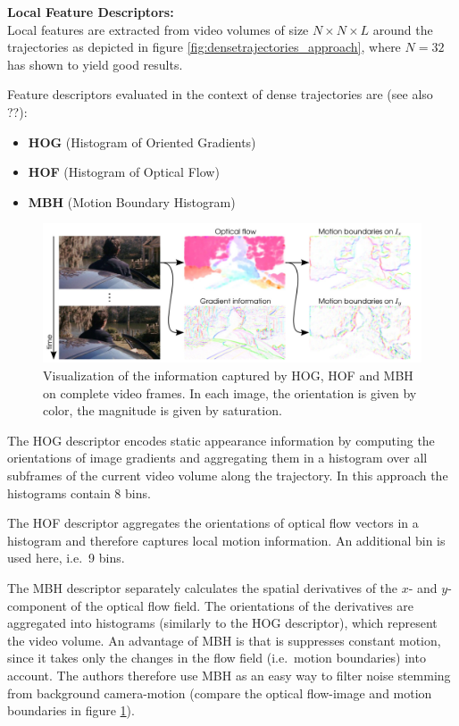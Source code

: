 \textbf{Local Feature Descriptors:}\\
Local features are extracted from video volumes of size $N \times N \times L$ around the trajectories as depicted in figure \ref{fig:densetrajectories_approach}, where $N = 32$ has shown to yield good results.

Feature descriptors evaluated in the context of dense trajectories are (see also ??):
\begin{itemize}
    \item \textbf{HOG} (Histogram of Oriented Gradients) \cite{dalal_histograms_2005-1}
    \item \textbf{HOF} (Histogram of Optical Flow) \cite{laptev_learning_2008}
    \item \textbf{MBH} (Motion Boundary Histogram) \cite{dalal_human_2006}
\end{itemize}

\begin{figure}[H]
    \centering
    \includegraphics[width=\textwidth]{img_conventional/densetrajectories_featurevisualization}
    \caption{Visualization of the information captured by HOG, HOF and MBH on complete video frames. In each image, the orientation is given by color, the magnitude is given by saturation. \cite{wang_action_2011}}
    \label{fig:densetrajectories_featurevisualization}
\end{figure}

The HOG descriptor encodes static appearance information by computing the orientations of image gradients and aggregating them in a histogram over all subframes of the current video volume along the trajectory. In this approach the histograms contain 8 bins.

The HOF descriptor aggregates the orientations of optical flow vectors in a histogram and therefore captures local motion information. An additional bin is used here, i.e.\ 9 bins.

The MBH descriptor separately calculates the spatial derivatives of the $x$- and $y$-component of the optical flow field.
The orientations of the derivatives are aggregated into histograms (similarly to the HOG descriptor), which represent the video volume.
An advantage of MBH is that is suppresses constant motion, since it takes only the changes in the flow field (i.e.\ motion boundaries) into account.
The authors therefore use MBH as an easy way to filter noise stemming from background camera-motion (compare the optical flow-image and motion boundaries in figure \ref{fig:densetrajectories_featurevisualization}).

